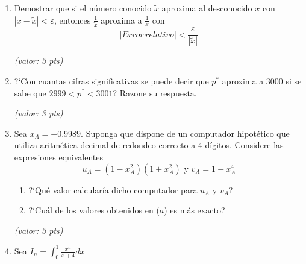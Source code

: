 \documentclass[12pt]{article}
\begin{document}
    \begin{enumerate}
        \item Demostrar que si el n\'umero conocido $\tilde x$ aproxima al desconocido $x$ con $|x - \tilde x|<\varepsilon$, 
        entonces $\displaystyle\frac{1}{\tilde x}$ aproxima a $\displaystyle\frac{1}{x}$ con
        $$
        |Error \, relativo| < \displaystyle\frac{\varepsilon}{|\tilde x|}
        $$
        \begin{flushright}
         {\small \it (valor: 3 pts)}
        \end{flushright}

        \item ?`Con cuantas cifras significativas se puede decir que $p^*$ aproxima a 3000 si se sabe que $2999 < p^*<3001$? 
        Razone su respuesta. 
        \begin{flushright}
         {\small \it (valor: 3 pts)}
        \end{flushright}

        \item Sea $x_A = -0.9989$. Suponga que dispone de un computador hipot\'etico que utiliza aritm\'etica decimal de 
redondeo correcto a 4 d\'igitos. Considere las expresiones equivalentes
$$
u_A = (1-x_A^2)(1+x_A^2) \mbox{ y } v_A = 1-x_A^4
$$
\begin{enumerate}
 \item ?`Qu\'e valor calcular\'ia dicho computador para $u_A$ y $v_A$?
 \item ?`Cu\'al de los valores obtenidos en ($a$) es m\'as exacto?
\end{enumerate}
\begin{flushright}
 {\small \it (valor: 3 pts)}
\end{flushright}

\item Sea $I_{n}={\displaystyle \int_{0}^{1}\frac{x^{n}}{x+4}dx}$


\end{enumerate}
\end{document}
